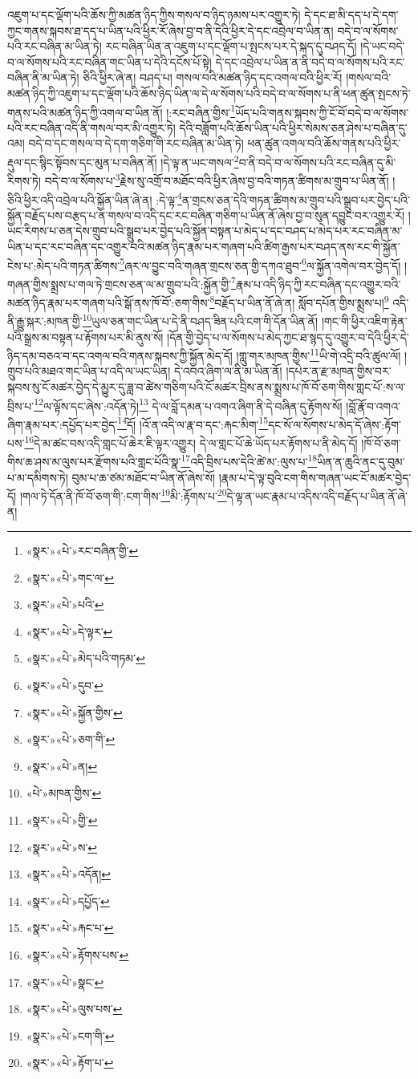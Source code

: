 འཇུག་པ་དང་ལྡོག་པའི་ཆོས་ཀྱི་མཚན་ཉིད་ཀྱིས་གསལ་བ་ཉིད་ཉམས་པར་འགྱུར་ཏེ། དེ་དང་ཐ་མི་དད་པ་དེ་དག་ཀྱང་གནས་སྐབས་ཐ་དད་པ་ཡིན་པའི་ཕྱིར་རོ་ཞེས་བྱ་བ་ནི་དེའི་ཕྱིར་དེ་དང་འབྲེལ་བ་ཡིན་ན། བདེ་བ་ལ་སོགས་པའི་རང་བཞིན་མ་ཡིན་ཏེ། རང་བཞིན་ཡིན་ན་འཇུག་པ་དང་ལྡོག་པ་སྤངས་པར་དེ་སྐད་དུ་བཤད་དོ། །དེ་ཡང་བདེ་བ་ལ་སོགས་པའི་རང་བཞིན་གང་ཡིན་པ་དེའི་དངོས་པོ་སྟེ། དེ་དང་འབྲེལ་པ་ཡིན་ན་ནི་བདེ་བ་ལ་སོགས་པའི་རང་བཞིན་ནི་མ་ཡིན་ཏེ། ཅིའི་ཕྱིར་ཞེ་ན། བཤད་པ། གསལ་བའི་མཚན་ཉིད་དང་འགལ་བའི་ཕྱིར་རོ། །གསལ་བའི་མཚན་ཉིད་ཀྱི་འཇུག་པ་དང་ལྡོག་པའི་ཆོས་ཉིད་ཡིན་ལ་དེ་ལ་སོགས་པའི་བདེ་བ་ལ་སོགས་པ་ནི་ཕན་ཚུན་སྤངས་ཏེ་གནས་པའི་མཚན་ཉིད་ཀྱི་འགལ་བ་ཡིན་ནོ། །:རང་བཞིན་གྱིས་\footnote{«སྣར་»«པེ་»རང་བཞིན་གྱི་}ཡོད་པའི་གནས་སྐབས་ཀྱི་ངོ་བོ་བདེ་བ་ལ་སོགས་པའི་རང་བཞིན་འདི་ནི་གསལ་བར་མི་འགྱུར་ཏེ། དེའི་བཟློག་པའི་ཆོས་ཡིན་པའི་ཕྱིར་སེམས་ཅན་ཤེས་པ་བཞིན་དུ་འམ། བདེ་བ་དང་གསལ་བ་དེ་དག་གཅིག་གི་རང་བཞིན་མ་ཡིན་ཏེ། ཕན་ཚུན་འགལ་བའི་ཆོས་གནས་པའི་ཕྱིར་རྡུལ་དང་སྙིང་སྟོབས་དང་མུན་པ་བཞིན་ནོ། །དེ་ལྟ་ན་ཡང་གསལ་\footnote{«སྣར་»«པེ་»གང་ལ་}བ་ནི་བདེ་བ་ལ་སོགས་པའི་རང་བཞིན་དུ་མི་རིགས་ཏེ། བདེ་བ་ལ་སོགས་པ་\footnote{«སྣར་»«པེ་»པའི་}རྗེས་སུ་འགྲོ་བ་མཐོང་བའི་ཕྱིར་ཞེས་བྱ་བའི་གཏན་ཚིགས་མ་གྲུབ་པ་ཡིན་ནོ། །ཅིའི་ཕྱིར་འདི་འབྲེལ་པའི་སྐྱོན་ཡིན་ཞེ་ན། :དེ་ལྟ་\footnote{«སྣར་»«པེ་»དེ་ལྟར་}ན་གྲངས་ཅན་དེའི་གཏན་ཚིགས་མ་གྲུབ་པའི་སྒྲུབ་པར་བྱེད་པའི་སྐྱོན་བརྗོད་པས་བརྩད་པ་ན་གསལ་བ་འདི་དང་རང་བཞིན་གཅིག་པ་ཡིན་ནོ་ཞེས་བྱ་བ་སུན་དབྱུང་བར་འགྱུར་རོ། །ཡང་རིགས་པ་ཅན་དེས་གྲུབ་པའི་སྒྲུབ་པར་བྱེད་པའི་སྐྱོན་བསྟན་པ་མེད་པ་དང་བཤད་པ་མེད་པར་རང་བཞིན་མ་ཡིན་པ་དང་རང་བཞིན་དང་འགྱུར་བའི་མཚན་ཉིད་རྣམ་པར་གཞག་པའི་ཚིག་རྒྱས་པར་བཤད་ནས་རང་གི་སྐྱོན་ངེས་པ་:མེད་པའི་གཏན་ཚིགས་\footnote{«སྣར་»«པེ་»མེད་པའི་གཏམ་}ཞར་ལ་བྱུང་བའི་གཞན་གྲངས་ཅན་གྱི་དཀའ་ཐུབ་\footnote{«སྣར་»«པེ་»དུབ་}ལ་སྐྱོན་འགེལ་བར་བྱེད་དོ། །གཞན་གྱིས་སྨྲས་པ་གལ་ཏེ་གྲངས་ཅན་ལ་མ་གྲུབ་པའི་:སྐྱོན་གྱི་\footnote{«སྣར་»«པེ་»སྐྱོན་གྱིས་}རྣམ་པ་འདི་ཉིད་ཀྱི་རང་བཞིན་དང་འགྱུར་བའི་མཚན་ཉིད་རྣམ་པར་གཞག་པའི་སྒོ་ནས་ཁོ་བོ་:ཅག་གིས་\footnote{«སྣར་»«པེ་»ཅག་གི་}བརྗོད་པ་ཡིན་ནོ་ཞེ་ན། སློབ་དཔོན་གྱིས་སྨྲས་པ།\footnote{«སྣར་»«པེ་»ན།} འདི་ནི་རྒྱུ་སྐར་:མཁན་གྱི་\footnote{«པེ་»མཁན་གྱིས་}ཡུལ་ཅན་གང་ཡིན་པ་དེ་ནི་བཤད་ཟིན་པའི་ངག་གི་དོན་ཡིན་ནོ། །གང་གི་ཕྱིར་འཇིག་རྟེན་པའི་སྒྲས་མ་བསྟན་པ་རྟོགས་པར་མི་ནུས་སོ། །དོན་གྱི་བྱེད་པ་ལ་སོགས་པ་མེད་ཀྱང་ཐ་སྙད་དུ་འགྱུར་བ་དེའི་ཕྱིར་དེ་ཉིད་དམ་བཅའ་བ་དང་འགལ་བའི་གནས་སྐབས་ཀྱི་སྐྱོན་མེད་དོ། །གླུ་གར་མཁན་གྱིས་\footnote{«སྣར་»«པེ་»གྱི་}ཡི་གེ་འདྲི་བའི་ཚུལ་ལོ། །གྲུབ་པའི་མཐའ་གང་ཡིན་པ་འདི་ལ་ཡང་ཡིན། དེ་འབའ་ཞིག་ལ་ནི་མ་ཡིན་ནོ། །དཔེར་ན་རྫ་མཁན་གྱིས་བར་སྐབས་སུ་ངོ་མཚར་བྱེད་དེ་མྱུར་དུ་ཟླ་བ་ཚེས་གཅིག་པའི་ངོ་མཚར་བྲིས་ནས་སྨྲས་པ་ཁོ་བོ་ཅག་གིས་གླང་པོ་:ས་ལ་བྲིས་པ་\footnote{«སྣར་»«པེ་»ས་}ལ་ལྟོས་དང་ཞེས་:འདོན་ཏེ།\footnote{«སྣར་»«པེ་»འདོན།} དེ་ལ་བློ་དམན་པ་འགའ་ཞིག་ནི་དེ་བཞིན་དུ་རྟོགས་སོ། །བློ་རྣོ་བ་འགའ་ཞིག་རྣམ་པར་:དཔྱོད་པར་བྱེད་\footnote{«སྣར་»«པེ་»དཔྱོད་}དོ། །འོ་ན་འདི་ལ་རྣ་བ་དང་:རྐང་མིག་\footnote{«སྣར་»«པེ་»རྐང་པ་}དང་སོ་ལ་སོགས་པ་མེད་དོ་ཞེས་:རྟོག་པས་\footnote{«སྣར་»«པེ་»རྟོགས་པས་}དེ་མ་ཚང་བས་འདི་གླང་པོ་ཆེར་ཇི་ལྟར་འགྱུར། དེ་ལ་གླང་པོ་ཆེ་ཡོད་པར་རྟོགས་པ་ནི་མེད་དོ། །ཁོ་བོ་ཅག་གིས་ཆ་ཤས་མ་ལུས་པར་རྫོགས་པའི་གླང་པོའི་སྣ་\footnote{«སྣར་»«པེ་»སྣང་}འདི་བྲིས་པས་དེའི་ཚེ་མ་:ལུས་པ་\footnote{«སྣར་»«པེ་»ལུས་པས་}ཡིན་ན་ཆུའི་ནང་དུ་བུམ་པ་མ་དམིགས་ཏེ། བུམ་པ་ཆ་ཙམ་མཐོང་བ་ཡིན་ནོ་ཞེས་སོ། །རྣམ་པ་དེ་ལྟ་བུའི་ངག་གིས་གཞན་ཡང་ངོ་མཚར་བྱེད་དོ། །གལ་ཏེ་དོན་ནི་ཁོ་བོ་ཅག་གི་:ངག་གིས་\footnote{«སྣར་»«པེ་»ངག་གི་}མི་:རྟོགས་པ་\footnote{«སྣར་»«པེ་»རྟོག་པ་}དེ་ལྟ་ན་ཡང་རྣམ་པ་འདིས་འདི་བརྗོད་པ་ཡིན་ནོ་ཞེ་ན། 